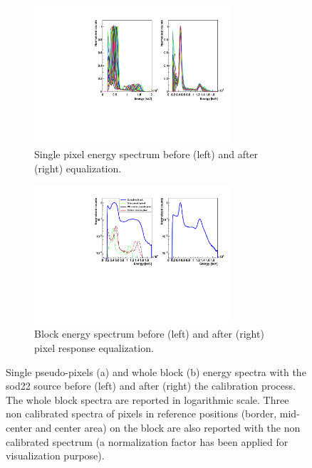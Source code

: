 \begin{figure}
\begin{subfigure}[t]{1\textwidth}
\centering
\includegraphics[width=0.8\textwidth]{03_GraphicFiles/chapter3_CLaRySproto/Absorber/images/EspectraOverlap_noAngles.pdf}
\caption{Single pixel energy spectrum before (left) and after (right) equalization.}
\label{chap3::fig::abssinglePixCal}
\end{subfigure}
\begin{subfigure}[t]{1\textwidth}
\centering
\includegraphics[width=0.8\textwidth]{03_GraphicFiles/chapter3_CLaRySproto/Absorber/images/Espectra_withSingles.pdf}
\caption{Block energy spectrum before (left) and after (right) pixel response equalization.}
\label{chap3::fig::absEspectrumCal}
\end{subfigure}
\caption{Single pseudo-pixels (a) and whole block (b) energy spectra with the \gls{sod22} source before (left) and after (right) the calibration process. The whole block spectra are reported in logarithmic scale. Three non calibrated spectra of pixels in reference positions (border, mid-center and center area) on the block are also reported with the non calibrated spectrum (a normalization factor has been applied for visualization purpose).}
\label{chap3::fig::abspixCal_analysis}
\end{figure}

